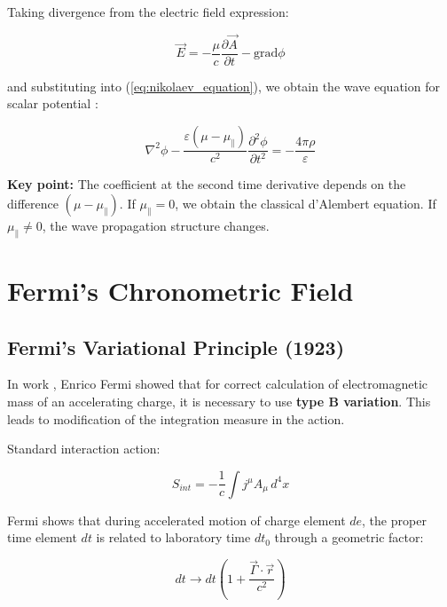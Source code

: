 \documentclass[12pt, a4paper]{article}
\begin{document}
Taking divergence from the electric field expression:

\begin{equation}
\vec{E} = -\frac{\mu}{c} \frac{\partial \vec{A}}{\partial t} - \text{grad} \phi
\label{eq:electric_field_potentials}
\end{equation}

and substituting into (\ref{eq:nikolaev_equation}), we obtain the wave equation for scalar potential \cite{NikolaevLorentz}:

\begin{equation}
\nabla^2 \phi - \frac{\varepsilon(\mu - \mu_{\parallel})}{c^2} \frac{\partial^2 \phi}{\partial t^2} = -\frac{4\pi\rho}{\varepsilon}
\label{eq:wave_equation_modified}
\end{equation}

\textbf{Key point:} The coefficient at the second time derivative depends on the difference $(\mu - \mu_{\parallel})$. If $\mu_{\parallel} = 0$, we obtain the classical d'Alembert equation. If $\mu_{\parallel} \neq 0$, the wave propagation structure changes.

\section{Fermi's Chronometric Field}

\subsection{Fermi's Variational Principle (1923)}

In work \cite{Fermi1923}, Enrico Fermi showed that for correct calculation of electromagnetic mass of an accelerating charge, it is necessary to use \textbf{type B variation}. This leads to modification of the integration measure in the action.

Standard interaction action:

\begin{equation}
S_{int} = -\frac{1}{c} \int j^\mu A_\mu \, d^4x
\label{eq:action_standard}
\end{equation}

Fermi shows that during accelerated motion of charge element $de$, the proper time element $dt$ is related to laboratory time $dt_0$ through a geometric factor:

\begin{equation}
dt \longrightarrow dt \left( 1 + \frac{\vec{\Gamma} \cdot \vec{r}}{c^2} \right)
\label{eq:fermi_correction}
\end{equation}
\end{document}
